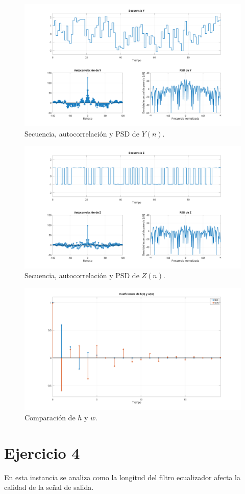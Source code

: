 \begin{figure}[h]
	\centering
	\includegraphics[width=1\linewidth]{img/ej3_y.pdf}
	\caption{Secuencia, autocorrelación y PSD de $Y(n)$.}
	\label{fig:ej3_y}
\end{figure}

\begin{figure}[h]
	\centering
	\includegraphics[width=1\linewidth]{img/ej3_z.pdf}
	\caption{Secuencia, autocorrelación y PSD de $Z(n)$.}
	\label{fig:ej3_z}
\end{figure}

\begin{figure}[h]
	\centering
	\includegraphics[width=1\linewidth]{img/ej3_coef.pdf}
	\caption{Comparación de $h$ y $w$.}
	\label{fig:ej3_coef}
\end{figure}

\section{Ejercicio 4}

En esta instancia se analiza como la longitud del filtro ecualizador afecta la calidad de la señal de salida.
